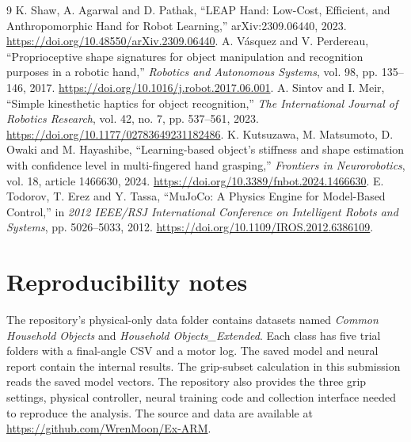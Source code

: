 \documentclass[12pt,a4paper]{article}
\begin{document}
\begin{thebibliography}{9}
 K. Shaw, A. Agarwal and D. Pathak, ``LEAP Hand: Low-Cost, Efficient, and Anthropomorphic Hand for Robot Learning,'' arXiv:2309.06440, 2023. \url{https://doi.org/10.48550/arXiv.2309.06440}.
 A. V\'asquez and V. Perdereau, ``Proprioceptive shape signatures for object manipulation and recognition purposes in a robotic hand,'' \emph{Robotics and Autonomous Systems}, vol. 98, pp. 135--146, 2017. \url{https://doi.org/10.1016/j.robot.2017.06.001}.
 A. Sintov and I. Meir, ``Simple kinesthetic haptics for object recognition,'' \emph{The International Journal of Robotics Research}, vol. 42, no. 7, pp. 537--561, 2023. \url{https://doi.org/10.1177/02783649231182486}.
 K. Kutsuzawa, M. Matsumoto, D. Owaki and M. Hayashibe, ``Learning-based object's stiffness and shape estimation with confidence level in multi-fingered hand grasping,'' \emph{Frontiers in Neurorobotics}, vol. 18, article 1466630, 2024. \url{https://doi.org/10.3389/fnbot.2024.1466630}.
 E. Todorov, T. Erez and Y. Tassa, ``MuJoCo: A Physics Engine for Model-Based Control,'' in \emph{2012 IEEE/RSJ International Conference on Intelligent Robots and Systems}, pp. 5026--5033, 2012. \url{https://doi.org/10.1109/IROS.2012.6386109}.
\end{thebibliography}

\appendix
\section{Reproducibility notes}

The repository's physical-only data folder contains datasets named \emph{Common Household Objects} and \emph{Household Objects\_Extended}. Each class has five trial folders with a final-angle CSV and a motor log. The saved model and neural report contain the internal results. The grip-subset calculation in this submission reads the saved model vectors. The repository also provides the three grip settings, physical controller, neural training code and collection interface needed to reproduce the analysis. The source and data are available at \url{https://github.com/WrenMoon/Ex-ARM}.
\end{document}
